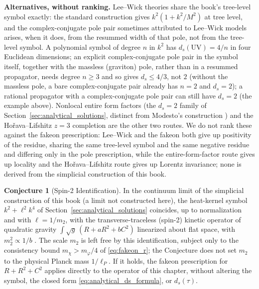 \documentclass[11pt,a4paper,reqno]{amsart}
\theoremstyle{definition}
\newtheorem{conjecture}[theorem]{Conjecture}
\numberwithin{equation}{section}
\begin{document}
\textbf{Alternatives, without ranking.} Lee--Wick theories \cite{LeeWick1970, GOW2008} share the book's tree-level symbol exactly: the standard construction gives $k^2(1 + k^2/M^2)$ at tree level, and the complex-conjugate pole pair sometimes attributed to Lee--Wick models arises, when it does, from the resummed width of that pole, not from the tree-level symbol. A polynomial symbol of degree $n$ in $k^2$ has $d_s(\mathrm{UV}) = 4/n$ in four Euclidean dimensions; an explicit complex-conjugate pole pair in the symbol itself, together with the massless (graviton) pole, rather than in a resummed propagator, needs degree $n \ge 3$ and so gives $d_s \le 4/3$, not $2$ (without the massless pole, a bare complex-conjugate pair already has $n = 2$ and $d_s = 2$); a rational propagator with a complex-conjugate pole pair can still have $d_s = 2$ (the example above). Nonlocal entire form factors (the $d_s = 2$ family of Section~\ref{sec:analytical_solutions}, distinct from Modesto's construction \cite{modesto2012}) and the Ho\v{r}ava--Lifshitz $z = 3$ completion \cite{horava2009spectral} are the other two routes. We do not rank these against the fakeon prescription: Lee--Wick and the fakeon both give up positivity of the residue, sharing the same tree-level symbol and the same negative residue and differing only in the pole prescription, while the entire-form-factor route gives up locality and the Ho\v{r}ava--Lifshitz route gives up Lorentz invariance; none is derived from the simplicial construction of this book.

\begin{conjecture}[Spin-2 Identification]
\label{conj:spin2_identification}
In the continuum limit of the simplicial construction of this book (a limit not constructed here), the heat-kernel symbol $k^2 + \ell^2 k^4$ of Section~\ref{sec:analytical_solutions} coincides, up to normalization and with $\ell = 1/m_2$, with the transverse-traceless (spin-2) kinetic operator of quadratic gravity $\int \sqrt{g}\, (R + aR^2 + bC^2)$ linearized about flat space, with $m_2^2 \propto 1/b$ \cite{Stelle1978}. The scale $m_2$ is left free by this identification, subject only to the consistency bound $m_\chi > m_\varphi/4$ of \eqref{eq:fakeon_r}; the Conjecture does not set $m_2$ to the physical Planck mass $1/\ell_P$. If it holds, the fakeon prescription for $R + R^2 + C^2$ applies directly to the operator of this chapter, without altering the symbol, the closed form \eqref{eq:analytical_ds_formula}, or $d_s(\tau)$.
\end{conjecture}
\end{document}
